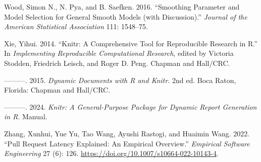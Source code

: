 \documentclass[
]{article}
\newlength{\cslhangindent}
\newenvironment{CSLReferences}[2] %
 {\begin{list}{}{%
  \setlength{\itemindent}{0pt}
  \setlength{\leftmargin}{0pt}
  \setlength{\parsep}{0pt}
  \ifodd #1
   \setlength{\leftmargin}{\cslhangindent}
   \setlength{\itemindent}{-1\cslhangindent}
  \fi
  \setlength{\itemsep}{#2\baselineskip}}}
 {\end{list}}
\begin{document}
\begin{CSLReferences}{1}{0}
Wood, Simon N., N. Pya, and B. Saefken. 2016. {``Smoothing Parameter and
Model Selection for General Smooth Models (with Discussion).''}
\emph{Journal of the American Statistical Association} 111: 1548--75.

Xie, Yihui. 2014. {``Knitr: A Comprehensive Tool for Reproducible
Research in {R}.''} In \emph{Implementing Reproducible Computational
Research}, edited by Victoria Stodden, Friedrich Leisch, and Roger D.
Peng. {Chapman and Hall/CRC}.

---------. 2015. \emph{Dynamic Documents with {R} and Knitr}. 2nd ed.
Boca Raton, Florida: {Chapman and Hall/CRC}.

---------. 2024. \emph{Knitr: A General-Purpose Package for Dynamic
Report Generation in {R}}. Manual.

Zhang, Xunhui, Yue Yu, Tao Wang, Ayushi Rastogi, and Huaimin Wang. 2022.
{``Pull Request Latency Explained: An Empirical Overview.''}
\emph{Empirical Software Engineering} 27 (6): 126.
\url{https://doi.org/10.1007/s10664-022-10143-4}.

\end{CSLReferences}
\end{document}
